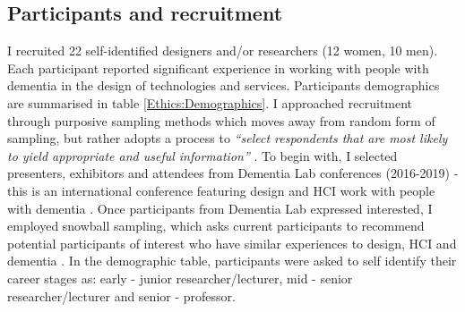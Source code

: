 \subsection{Participants and recruitment}
\label{Ethics:Participants}
I recruited 22 self-identified designers and/or researchers (12 women, 10 men). Each participant reported significant experience in working with people with dementia in the design of technologies and services. Participants demographics are summarised in table \ref{Ethics:Demographics}. I approached recruitment through purposive sampling methods which moves away from random form of sampling, but rather adopts a process to \textit{``select respondents that are most likely to yield appropriate and useful information''} \citep[pg. 317]{kelly2010qualitative}. To begin with, I selected presenters, exhibitors and attendees from Dementia Lab conferences (2016-2019) - this is an international conference featuring design and HCI work with people with dementia \citep{brankaert_dementia_2019}. Once participants from Dementia Lab expressed interested, I employed snowball sampling, which asks current participants to recommend potential participants of interest who have similar experiences to design, HCI and dementia \citep{noy_sampling_2008}. In the demographic table, participants were asked to self identify their career stages as: early - junior researcher/lecturer, mid - senior researcher/lecturer and senior - professor.

